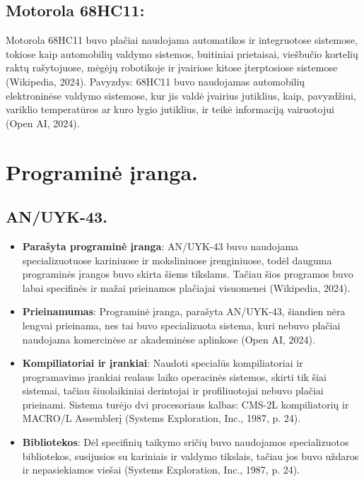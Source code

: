 \documentclass[a4paper,12pt]{article}
\begin{document}
\subsection{Motorola 68HC11:}
Motorola 68HC11 buvo plačiai naudojama automatikos ir integruotose sistemose, tokiose kaip automobilių valdymo sistemos, buitiniai prietaisai, viešbučio kortelių raktų rašytojuose, mėgėjų robotikoje ir įvairiose kitose įterptosiose sistemose (Wikipedia, 2024). Pavyzdys: 68HC11 buvo naudojamas automobilių elektroninėse valdymo sistemose, kur jis valdė įvairius jutiklius, kaip, pavyzdžiui, variklio temperatūros ar kuro lygio jutiklius, ir teikė informaciją vairuotojui (Open AI, 2024).

\section{Programinė įranga.}
\subsection{AN/UYK-43.}
\begin{itemize}
    \item \textbf{Parašyta programinė įranga}: AN/UYK-43 buvo naudojama specializuotuose kariniuose ir moksliniuose įrenginiuose, todėl dauguma programinės įrangos buvo skirta šiems tikslams. Tačiau šios programos buvo labai specifinės ir mažai prieinamos plačiajai visuomenei (Wikipedia, 2024).
    \item \textbf{Prieinamumas}: Programinė įranga, parašyta AN/UYK-43, šiandien nėra lengvai prieinama, nes tai buvo specializuota sistema, kuri nebuvo plačiai naudojama komercinėse ar akademinėse aplinkose (Open AI, 2024).
    \item \textbf{Kompiliatoriai ir įrankiai}: Naudoti specialūs kompiliatoriai ir programavimo įrankiai realaus laiko operacinės sistemos, skirti tik šiai sistemai, tačiau šiuolaikiniai derintojai ir profiliuotojai nebuvo plačiai prieinami. Sistema turėjo dvi procesoriaus kalbas: CMS-2L kompiliatorių ir MACRO/L Assemblerį (Systems Exploration, Inc., 1987, p. 24).
    \item \textbf{Bibliotekos}: Dėl specifinių taikymo sričių buvo naudojamos specializuotos bibliotekos, susijusios su kariniais ir valdymo tikslais, tačiau jos buvo uždaros ir nepasiekiamos viešai (Systems Exploration, Inc., 1987, p. 24).
\end{itemize}
\end{document}
